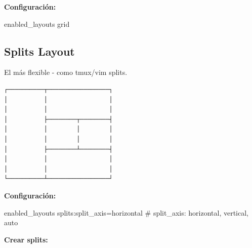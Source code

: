 \documentclass[
  doc,
  floatsintext,
  longtable,
  a4paper,
  nolmodern,
  notxfonts,
  notimes,
  12pt,
  colorlinks=true,linkcolor=blue,citecolor=blue,urlcolor=blue]{apa7}
\newenvironment{Shaded}{\begin{snugshade}}{\end{snugshade}}
\newcommand{\CommentTok}[1]{\textcolor[rgb]{0.37,0.37,0.37}{#1}}
\newcommand{\DataTypeTok}[1]{\textcolor[rgb]{0.68,0.00,0.00}{#1}}
\newcommand{\ErrorTok}[1]{\textcolor[rgb]{0.68,0.00,0.00}{#1}}
\newcommand{\OperatorTok}[1]{\textcolor[rgb]{0.37,0.37,0.37}{#1}}
\begin{document}
\textbf{Configuración:}

\begin{Shaded}
\begin{Highlighting}[]
\DataTypeTok{enabled\_layouts} \DataTypeTok{grid}
\end{Highlighting}
\end{Shaded}

\subsection{Splits Layout}\label{splits-layout}

El más flexible - como tmux/vim splits.

\begin{verbatim}
┌──────────┬─────────────────┐
│          │                 │
│          │                 │
│          ├────────┬────────┤
│          │        │        │
│          │        │        │
│          ├────────┴────────┤
│          │                 │
│          │                 │
└──────────┴─────────────────┘
\end{verbatim}

\textbf{Configuración:}

\begin{Shaded}
\begin{Highlighting}[]
\DataTypeTok{enabled\_layouts} \DataTypeTok{splits}\ErrorTok{:}\DataTypeTok{split\_axis}\OperatorTok{=}\DataTypeTok{horizontal}
\CommentTok{\# split\_axis: horizontal, vertical, auto}
\end{Highlighting}
\end{Shaded}

\textbf{Crear splits:}
\end{document}
